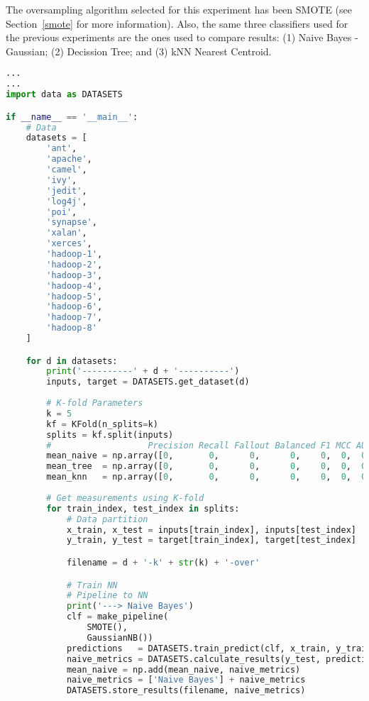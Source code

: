 The oversampling algorithm selected for this experiment has been SMOTE 
(see Section~\ref{smote} for more information). Also, the same three classifiers
used for the previous experiments are the ones used to compare results: 
(1) Naive Bayes - Gaussian; (2) Decission Tree; and (3) kNN Nearest Centroid.

\begin{lstlisting}[language=Python, caption={Calculate Metrics from Confusion 
Matrix to compare in-fold results after applying over-sampling filter}, 
label={lst:metrics-kfold-oversampling}]
...
...
import data as DATASETS

if __name__ == '__main__':
    # Data
    datasets = [
        'ant',
        'apache',
        'camel',
        'ivy',
        'jedit',
        'log4j',
        'poi',
        'synapse',
        'xalan',
        'xerces',
        'hadoop-1',
        'hadoop-2',
        'hadoop-3',
        'hadoop-4',
        'hadoop-5',
        'hadoop-6',
        'hadoop-7',
        'hadoop-8'
    ]

    for d in datasets:
        print('----------' + d + '----------')
        inputs, target = DATASETS.get_dataset(d)
    
        # K-fold Parameters
        k = 5
        kf = KFold(n_splits=k)
        splits = kf.split(inputs)
        #                   Precision Recall Fallout Balanced F1 MCC AUC
        mean_naive = np.array([0,       0,      0,      0,    0,  0,  0])
        mean_tree  = np.array([0,       0,      0,      0,    0,  0,  0])
        mean_knn   = np.array([0,       0,      0,      0,    0,  0,  0])
        
        # Get measurements using K-fold
        for train_index, test_index in splits:
            # Data partition
            x_train, x_test = inputs[train_index], inputs[test_index]
            y_train, y_test = target[train_index], target[test_index]

            filename = d + '-k' + str(k) + '-over'

            # Train NN
            # Pipeline to NN
            print('---> Naive Bayes')
            clf = make_pipeline(
                SMOTE(),
                GaussianNB())
            predictions   = DATASETS.train_predict(clf, x_train, y_train, x_test)
            naive_metrics = DATASETS.calculate_results(y_test, predictions)
            mean_naive = np.add(mean_naive, naive_metrics)
            naive_metrics = ['Naive Bayes'] + naive_metrics
            DATASETS.store_results(filename, naive_metrics)


\end{lstlisting}
